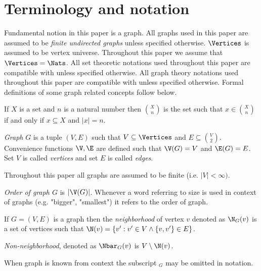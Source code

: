 
\section{Terminology and notation}

Fundamental notion in this paper is a graph. All graphs used in this paper are assumed to be \emph{finite undirected graphs} unless specified otherwise. $\Vertices$ is assumed to be vertex universe. Throughout this paper we assume that $\Vertices = \Nats$. All set theoretic notations used throughout this paper are compatible with \cite{jech} unless specified otherwise. All graph theory notations used throughout this paper are compatible with \cite{bollobas} unless specified otherwise. Formal definitions of some graph related concepts follow below.

\begin{defi}
    If $X$ is a set and $n$ is a natural number then $\binom{X}{n}$ is the set such that $x \in \binom{X}{n}$ if and only if $x \subseteq X$ and $|x| = n$.
\end{defi}

\begin{defi}
    \emph{Graph} $G$ is a tuple $(V,E)$ such that $V \subseteq \Vertices$ and $E \subseteq \binom{V}{2}$. Convenience functions $\V, \E$ are defined such that $\V(G) = V$ and $\E(G) = E$. Set $V$ is called \emph{vertices} and set $E$ is called \emph{edges}.

    Throughout this paper all graphs are assumed to be finite (i.e. $|V| < \infty)$.
\end{defi}

\begin{defi}
    \emph{Order of graph $G$} is $|\V(G)|$. Whenever a word referring to size is used in context of graphs (e.g. "bigger", "smallest") it refers to the order of graph.
\end{defi}

\begin{defi}
    If $G = (V,E)$ is a graph then the \emph{neighborhood} of vertex $v$ denoted as $\N_G(v)$ is a set of vertices such that $\N(v) = \{v' : v' \in V \land \{v, v'\} \in E\}$.

    \emph{Non-neighborhood}, denoted as $\Nbar_G(v)$ is $V \setminus \N(v)$.

    When graph is known from context the subscript $_G$ may be omitted in notation.
\end{defi}

